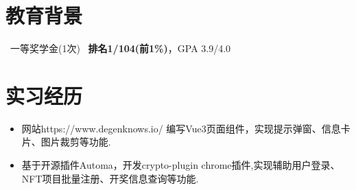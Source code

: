 \documentclass{resume}
\begin{document}
\begin{spacing}{1.2}



\vspace{0.2em}
\section{教育背景}
\ 一等奖学金(1次)
\ \textbf{排名1/104(前1\%)}，GPA 3.9/4.0

\vspace{0.2em}


\section{实习经历}

\begin{itemize}[parsep=0.8ex]
  \item 网站https://www.degenknows.io/ 编写Vue3页面组件，实现提示弹窗、信息卡片、图片裁剪等功能.
  \item 基于开源插件Automa，开发crypto-plugin chrome插件,实现辅助用户登录、NFT项目批量注册、开奖信息查询等功能.
\end{itemize}


\end{spacing}
\end{document}
